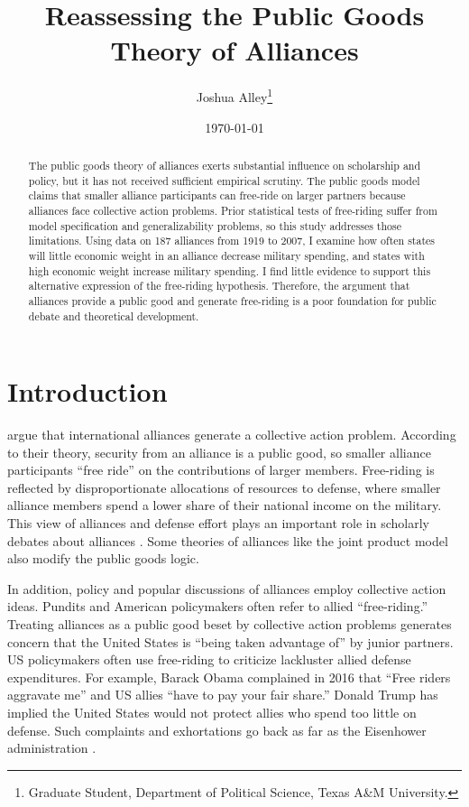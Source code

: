 \documentclass[12pt]{article}
\title{
\textbf{Reassessing the Public Goods Theory of Alliances}
	}
\author{Joshua Alley\footnote{Graduate Student,
Department of Political Science, Texas A\&M University.}}
\date{{\normalsize \today}}
\begin{document}
\maketitle 

\doublespace

\begin{abstract}
The public goods theory of alliances exerts substantial influence on scholarship and policy, but it has not received sufficient empirical scrutiny. 
The public goods model claims that smaller alliance participants can free-ride on larger partners because alliances face collective action problems. 
Prior statistical tests of free-riding suffer from model specification and generalizability problems, so this study addresses those limitations. 
Using data on 187 alliances from 1919 to 2007, I examine how often states will little economic weight in an alliance decrease military spending, and states with high economic weight increase military spending. 
I find little evidence to support this alternative expression of the free-riding hypothesis. 
Therefore, the argument that alliances provide a public good and generate free-riding is a poor foundation for public debate and theoretical development. 
\end{abstract} 

\newpage


\section{Introduction}



\citet{OlsonZeckhauser1966} argue that international alliances generate a collective action problem. 
According to their theory, security from an alliance is a public good, so smaller alliance participants ``free ride'' on the contributions of larger members. 
Free-riding is reflected by disproportionate allocations of resources to defense, where smaller alliance members spend a lower share of their national income on the military.
This view of alliances and defense effort plays an important role in scholarly debates about alliances \citep{Walt1990, Mearsheimer1994, Goldstein1995, SandlerHartley2001, Garfinkel2004, Walt2009, Norrlof2010, Barrett2010, PluemperNeumayer2015}. 
Some theories of alliances like the joint product model \citep{Sandler1993} also modify the public goods logic. 


In addition, policy and popular discussions of alliances employ collective action ideas.
Pundits and American policymakers often refer to allied ``free-riding.'' 
Treating alliances as a public good beset by collective action problems generates concern that the United States is ``being taken advantage of'' by junior partners. 
US policymakers often use free-riding to criticize lackluster allied defense expenditures.  
For example, Barack Obama complained in 2016 that ``Free riders aggravate me'' and US allies ``have to pay your fair share.'' 
Donald Trump has implied the United States would not protect allies who spend too little on defense. 
Such complaints and exhortations go back as far as the Eisenhower administration \citep{Lanoszka2015}.
\end{document}
